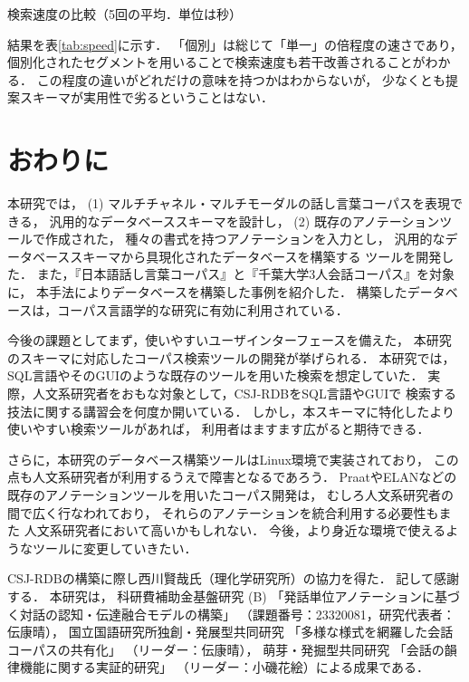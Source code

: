 \documentclass[japanese]{jnlp_1.4}
\begin{document}
\begin{table}[t]
\caption{検索速度の比較（5回の平均．単位は秒）}
\label{tab:speed}

\end{table}

結果を表\ref{tab:speed}に示す．
「個別」は総じて「単一」の倍程度の速さであり，
個別化されたセグメントを用いることで検索速度も若干改善されることがわかる．
この程度の違いがどれだけの意味を持つかはわからないが，
少なくとも提案スキーマが実用性で劣るということはない．


\section{おわりに}
\label{sec:Conclusion}

本研究では，
(1) マルチチャネル・マルチモーダルの話し言葉コーパスを表現できる，
汎用的なデータベーススキーマを設計し，
(2) 既存のアノテーションツールで作成された，
種々の書式を持つアノテーションを入力とし，
汎用的なデータベーススキーマから具現化されたデータベースを構築する
ツールを開発した．
また，『日本語話し言葉コーパス』と『千葉大学3人会話コーパス』を対象に，
本手法によりデータベースを構築した事例を紹介した．
構築したデータベースは，コーパス言語学的な研究に有効に利用されている．

今後の課題としてまず，使いやすいユーザインターフェースを備えた，
本研究のスキーマに対応したコーパス検索ツールの開発が挙げられる．
本研究では，
SQL言語やそのGUIのような既存のツールを用いた検索を想定していた．
実際，人文系研究者をおもな対象として，CSJ-RDBをSQL言語やGUIで
検索する技法に関する講習会を何度か開いている．
しかし，本スキーマに特化したより使いやすい検索ツールがあれば，
利用者はますます広がると期待できる．

さらに，本研究のデータベース構築ツールはLinux環境で実装されており，
この点も人文系研究者が利用するうえで障害となるであろう．
PraatやELANなどの既存のアノテーションツールを用いたコーパス開発は，
むしろ人文系研究者の間で広く行なわれており，
それらのアノテーションを統合利用する必要性もまた
人文系研究者において高いかもしれない．
今後，より身近な環境で使えるようなツールに変更していきたい．

\acknowledgment

CSJ-RDBの構築に際し西川賢哉氏（理化学研究所）の協力を得た．
記して感謝する．
本研究は，
科研費補助金基盤研究 (B) 
「発話単位アノテーションに基づく対話の認知・伝達融合モデルの構築」
（課題番号：23320081，研究代表者：伝康晴），
国立国語研究所独創・発展型共同研究
「多様な様式を網羅した会話コーパスの共有化」
（リーダー：伝康晴），
萌芽・発掘型共同研究
「会話の韻律機能に関する実証的研究」
（リーダー：小磯花絵）による成果である．
\end{document}
